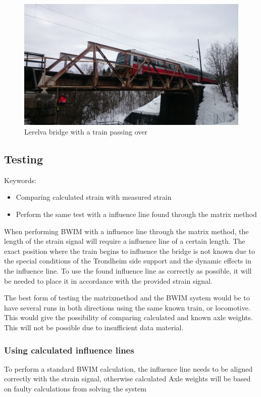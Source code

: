 \begin{figure}[H]
	\includegraphics[width=\textwidth]{figures/train_passing.jpg}
	\caption{Lerelva bridge with a train passing over}
	\label{fig:lerelva_bridge}
\end{figure}


\subsection{Testing}
Keywords:
\begin{itemize}
\item Comparing calculated strain with measured strain
\item Perform the same test with a influence line found through the matrix method
\end{itemize}

When performing BWIM with a influence line through the matrix method, the length of the strain signal will require a influence line of a certain length. The exact position where the train begins to influence the bridge is not known due to the special conditions of the Trondheim side support and the dynamic effects in the influence line.
To use the found influence line as correctly as possible, it will be needed to place it in accordance with the provided strain signal.

The best form of testing the matrixmethod and the BWIM system would be to have several runs in both directions using the same known train, or locomotive. This would give the possibility of comparing calculated and known axle weights. This will not be possible due to insufficient data material.


\subsubsection{Using calculated influence lines}
To perform a standard BWIM calculation, the influence line needs to be aligned correctly with the strain signal, otherwise calculated Axle weights will be based on faulty calculations from solving the system

